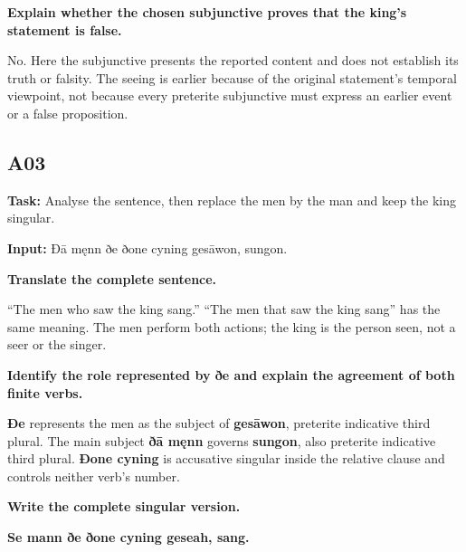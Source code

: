 \textbf{Explain whether the chosen subjunctive proves that the king’s statement is false.}

No. Here the subjunctive presents the reported content and does not establish its truth or falsity. The seeing is earlier because of the original statement’s temporal viewpoint, not because every preterite subjunctive must express an earlier event or a false proposition.

\subsection*{A03}

\textbf{Task:} Analyse the sentence, then replace the men by the man and keep the king singular.

\textbf{Input:} Ðā męnn ðe ðone cyning gesāwon, sungon.

\textbf{Translate the complete sentence.}

“The men who saw the king sang.” “The men that saw the king sang” has the same meaning. The men perform both actions; the king is the person seen, not a seer or the singer.

\textbf{Identify the role represented by ðe and explain the agreement of both finite verbs.}

\textbf{Ðe} represents the men as the subject of \textbf{gesāwon}, preterite indicative third plural. The main subject \textbf{ðā męnn} governs \textbf{sungon}, also preterite indicative third plural. \textbf{Ðone cyning} is accusative singular inside the relative clause and controls neither verb’s number.

\par\begin{minipage}{\linewidth}\raggedright
\textbf{Write the complete singular version.}

\textbf{Se mann ðe ðone cyning geseah, sang.}
\end{minipage}\par

